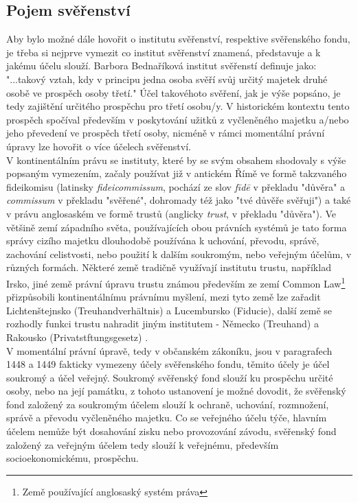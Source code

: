 \documentclass{article}
\begin{document}
\newpage

\subsection{Pojem svěřenství}

\indent Aby bylo možné dále hovořit o institutu svěřenství, respektive svěřenského fondu, je třeba si nejprve vymezit co institut svěřenství znamená, představuje a k jakému účelu slouží. Barbora Bednaříková institut svěřenstí definuje jako: "...takový vztah, kdy v principu jedna osoba svěří svůj určitý majetek druhé osobě ve prospěch osoby třetí." Účel takovéhoto svěření, jak je výše popsáno, je tedy zajištění určitého prospěchu pro třetí osobu/y. V historickém kontextu tento prospěch spočíval především v poskytování užitků z vyčleněného majetku a/nebo jeho převedení ve prospěch třetí osoby, nicméně v rámci momentální právní úpravy lze hovořit o více účelech svěřenství. \\

\indent V kontinentálním právu se instituty, které by se svým obsahem shodovaly s výše popsaným vymezením, začaly používat již v antickém Římě ve formě takzvaného fideikomisu (latinsky \textit{fideicommissum}, pochází ze slov \textit{fīdē} v překladu "důvěra" a \textit{commissum} v překladu "svěřené", dohromady též jako "tvé důvěře svěřuji") a také v právu anglosaském ve formě trustů (anglicky \textit{trust}, v překladu "důvěra"). Ve většině zemí západního světa, používajících obou právních systémů je tato forma správy cizího majetku dlouhodobě používána k uchování, převodu, správě, zachování celistvosti, nebo použití k dalším soukromým, nebo veřejným účelům, v různých formách. Některé země tradičně využívají institutu trustu, například Irsko, jiné země právní úpravu trustu známou především ze zemí Common Law\footnote{Země používající anglosaský systém práva} přizpůsobili kontinentálnímu právnímu myšlení, mezi tyto země lze zařadit Lichtenštejnsko (Treuhandverhältnis) a Lucembursko (Fiducie), další země se rozhodly funkci trustu nahradit jiným institutem - Německo (Treuhand) a Rakousko (Privatstftungsgesetz) . \\

\indent V momentální právní úpravě, tedy v občanském zákoníku, jsou v paragrafech 1448 a 1449 fakticky vymezeny účely svěřenského fondu, těmito účely je účel soukromý a účel veřejný. Soukromý svěřenský fond slouží ku prospěchu určité osoby, nebo na její památku, z tohoto ustanovení je možné dovodit, že svěřenský fond založený za soukromým účelem slouží k ochraně, uchování, rozmnožení, správě a převodu vyčleněného majetku. Co se veřejného účelu týče, hlavním účelem nemůže být dosahování zisku nebo provozování závodu, svěřenský fond založený za veřejným účelem tedy slouží k veřejnému, především socioekonomickému, prospěchu.\\
\end{document}
